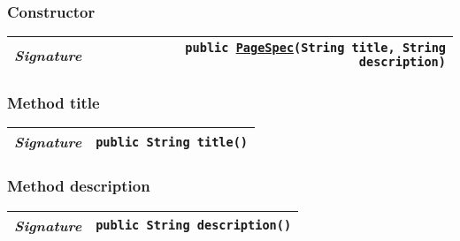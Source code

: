\begin{adjustwidth}{1.5em}{0pt}
\begin{adjustwidth}{1.5em}{0pt}
{\begin{tabularx}{1.0\linewidth}{@{}l R@{}}
    \end{tabularx}}\subsubsection{Constructor\label{edu.kit.hci.soli.config.template.PageSpec@edu.kit.hci.soli.config.template.PageSpec(java.lang.String,java.lang.String)}}
    \begin{adjustwidth}{1.5em}{0pt}
      {\begin{tabularx}{1.0\linewidth}{@{}l R@{}}
        \emph{Signature} & \texttt{public \texttt{\hyperref[edu.kit.hci.soli.config.template.PageSpec]{\texttt{PageSpec}}}(\texttt{String} title, \texttt{String} description)} \\
        \hline
  
      \end{tabularx}}
    \end{adjustwidth}\subsubsection{Method title\label{edu.kit.hci.soli.config.template.PageSpec@title()}}
    \begin{adjustwidth}{1.5em}{0pt}
      {\begin{tabularx}{1.0\linewidth}{@{}l R@{}}
        \emph{Signature} & \texttt{public \texttt{String} title()} \\
        \hline
  
      \end{tabularx}}
    \end{adjustwidth}\subsubsection{Method description\label{edu.kit.hci.soli.config.template.PageSpec@description()}}
    \begin{adjustwidth}{1.5em}{0pt}
      {\begin{tabularx}{1.0\linewidth}{@{}l R@{}}
        \emph{Signature} & \texttt{public \texttt{String} description()} \\
        \hline
  
      \end{tabularx}}
    \end{adjustwidth}
  \end{adjustwidth}
\end{adjustwidth}
